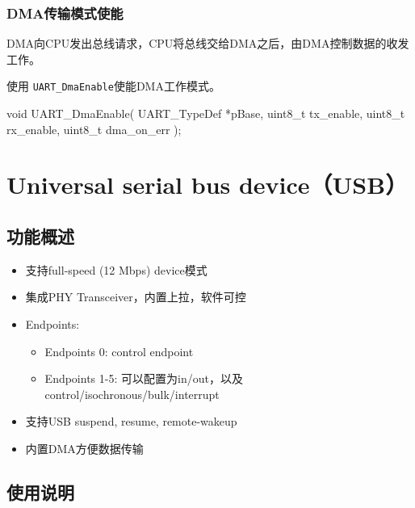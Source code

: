 \documentclass[
  12pt,
]{book}
\newenvironment{Shaded}{\begin{snugshade}}{\end{snugshade}}
\newcommand{\DataTypeTok}[1]{\textcolor[rgb]{0.13,0.29,0.53}{#1}}
\newcommand{\NormalTok}[1]{#1}
\providecommand{\tightlist}{%
  \setlength{\itemsep}{0pt}\setlength{\parskip}{0pt}}
\begin{document}
\hypertarget{dmaux4f20ux8f93ux6a21ux5f0fux4f7fux80fd}{%
\subsection{DMA传输模式使能}\label{dmaux4f20ux8f93ux6a21ux5f0fux4f7fux80fd}}

DMA向CPU发出总线请求，CPU将总线交给DMA之后，由DMA控制数据的收发工作。

使用 \texttt{UART\_DmaEnable}使能DMA工作模式。

\begin{Shaded}
\begin{Highlighting}[]
\DataTypeTok{void}\NormalTok{ UART_DmaEnable(}
\NormalTok{  UART_TypeDef *pBase, }
  \DataTypeTok{uint8_t}\NormalTok{ tx_enable, }
  \DataTypeTok{uint8_t}\NormalTok{ rx_enable, }
  \DataTypeTok{uint8_t}\NormalTok{ dma_on_err}
\NormalTok{  );}
\end{Highlighting}
\end{Shaded}

\hypertarget{universal-serial-bus-deviceusb}{%
\chapter{Universal serial bus device（USB）}\label{universal-serial-bus-deviceusb}}

\hypertarget{ux529fux80fdux6982ux8ff0-7}{%
\section{功能概述}\label{ux529fux80fdux6982ux8ff0-7}}

\begin{itemize}
\tightlist
\item
  支持full-speed (12 Mbps) device模式
\item
  集成PHY Transceiver，内置上拉，软件可控
\item
  Endpoints:

  \begin{itemize}
  \tightlist
  \item
    Endpoints 0: control endpoint
  \item
    Endpoints 1-5: 可以配置为in/out，以及control/isochronous/bulk/interrupt
  \end{itemize}
\item
  支持USB suspend, resume, remote-wakeup
\item
  内置DMA方便数据传输
\end{itemize}

\hypertarget{ux4f7fux7528ux8bf4ux660e-8}{%
\section{使用说明}\label{ux4f7fux7528ux8bf4ux660e-8}}
\end{document}
